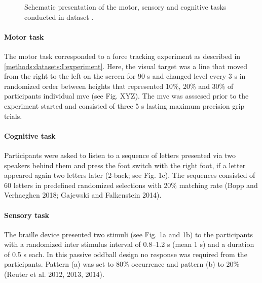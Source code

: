 \begin{figure}[h]
\begin{center}

\caption[Schematic presentation of the motor, sensory and cognitive tasks conducted in dataset .]{Schematic presentation of the motor, sensory and cognitive tasks conducted in dataset .}
\label{fig:DSII_exp3}
\end{center}
\end{figure}

\paragraph{Motor task}
The motor task corresponded to a force tracking experiment as described in \autoref{methods:datasets:I:experiment}. Here, the visual target was a line that moved from the right to the left on the screen for 90 s and changed level every 3 s in randomized order between heights that represented 10\%, 20\% and 30\% of participants individual \gls{mvc} (see Fig. XYZ). The \gls{mvc} was asssesed prior to the experiment started and consisted of three 5 s lasting maximum precision grip trials.

\paragraph{Cognitive task}
Participants were asked to listen to a sequence of letters presented via two speakers behind them and press the foot
switch with the right foot, if a letter appeared again two letters later (2-back; see Fig. 1c). The sequences consisted of 60 letters in predefined randomized selections with 20\% matching rate (Bopp and Verhaeghen 2018; Gajewski and Falkenstein 2014).

\paragraph{Sensory task}
The braille device presented two stimuli (see Fig. 1a and 1b) to the participants with a randomized inter stimulus
interval of 0.8–1.2 s (mean 1 s) and a duration of 0.5 s each. In this passive oddball design no response was
required from the participants. Pattern (a) was set to 80\% occurrence and pattern (b) to 20\% (Reuter et al. 2012, 2013, 2014).


